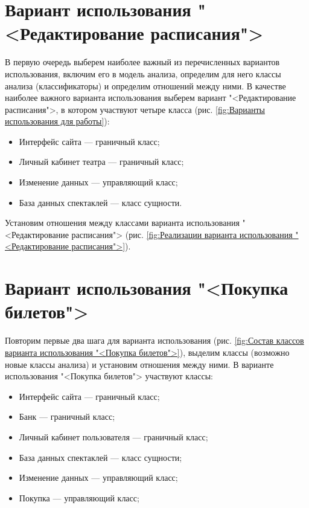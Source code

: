 \section{Вариант использования "<Редактирование расписания">}
В первую очередь выберем наиболее важный из перечисленных
вариантов использования, включим его в модель анализа, определим для него
классы анализа (классификаторы) и определим отношений между ними.
В качестве наиболее важного варианта использования выберем вариант
"<Редактирование расписания">, в котором участвуют четыре класса (рис. \ref{fig:Варианты использования для работы}):
\begin{itemize}
	\item Интерфейс сайта --- граничный класс;
	\item Личный кабинет театра --- граничный класс;
	\item Изменение данных --- управляющий класс;
	\item База данных спектаклей --- класс сущности.
\end{itemize}

Установим отношения между классами варианта использования
"<Редактирование расписания"> (рис. \ref{fig:Реализации варианта использования "<Редактирование расписания">}).

\section{Вариант использования "<Покупка билетов">}
Повторим первые два шага для варианта использования (рис. \ref{fig:Состав классов варианта использования "<Покупка билетов">}),
выделим классы (возможно новые классы анализа) и установим отношения
между ними.
В варианте использования "<Покупка билетов"> участвуют классы:
\begin{itemize}
	\item Интерфейс сайта --- граничный класс;
	\item Банк --- граничный класс;
	\item Личный кабинет пользователя --- граничный класс;
	\item База данных спектаклей --- класс сущности;
	\item Изменение данных --- управляющий класс;
	\item Покупка --- управляющий класс;
\end{itemize}

